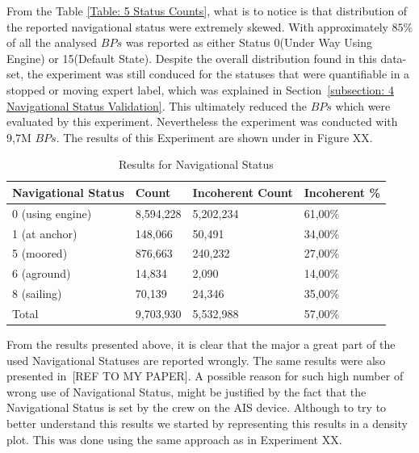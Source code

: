 From the Table \ref{Table: 5 Status Counts}, what is to notice is that distribution of the reported navigational status were extremely skewed. With approximately $85\%$ of all the analysed $BPs$ was reported as either Status 0(Under Way Using Engine) or 15(Default State). 
Despite the overall distribution found in this data-set, the experiment was still conduced for the statuses that were quantifiable in a stopped or moving expert label, which was explained in Section~\ref{subsection: 4 Navigational Status Validation}. 
This ultimately reduced the $BPs$ which were evaluated by this experiment. Nevertheless the experiment was conducted with 9,7M $BPs$. The results of this Experiment are shown under in Figure XX.
  
\begin{table}[H]
\centering
\caption{Results for Navigational Status}
\label{Table: 5 Status Results}
\begin{tabular}{llll}
\hline
Navigational Status & Count & Incoherent Count & Incoherent \% \\ \hline
0 (using engine) & 8,594,228 & 5,202,234 & 61,00\% \\
1 (at anchor) & 148,066 & 50,491 & 34,00\% \\
5 (moored) & 876,663 & 240,232 & 27,00\% \\
6 (aground) & 14,834 & 2,090 & 14,00\% \\
8 (sailing) & 70,139 & 24,346 & 35,00\% \\
Total & 9,703,930 & 5,532,988 & 57,00\% \\ \hline
\end{tabular}
\end{table}

From the results presented above, it is clear that the major a great part of the used Navigational Statuses are reported wrongly. The same results were also presented in~[REF TO MY PAPER]. A possible reason for such high number of wrong use of Navigational Status, might be justified by the fact that the Navigational Status is set by the crew on the AIS device. 
Although to try to better understand this results we started by representing this results in a density plot. This was done using the same approach as in Experiment XX.

